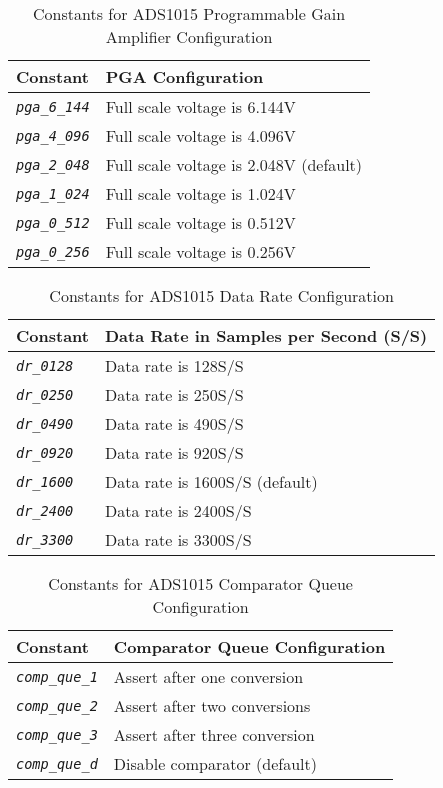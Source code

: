 \documentclass[10pt, openany]{book}
\newcommand{\constant}[1]{\emph{\texttt{#1}}}
\begin{document}
\begin{table}[!h]
\begin{center}
  \begin{tabular}{l|l}
    Constant & PGA Configuration \\
    \hline
    \constant{pga\_6\_144} & Full scale voltage is 6.144V \\
    \constant{pga\_4\_096} & Full scale voltage is 4.096V \\
    \constant{pga\_2\_048} & Full scale voltage is 2.048V (default) \\
    \constant{pga\_1\_024} & Full scale voltage is 1.024V \\
    \constant{pga\_0\_512} & Full scale voltage is 0.512V \\
    \constant{pga\_0\_256} & Full scale voltage is 0.256V \\
  \end{tabular}
  \caption{Constants for ADS1015 Programmable Gain Amplifier Configuration}
  \label{tbl:ADS1015PGA}
\end{center}
\end{table}

\begin{table}[!h]
\begin{center}
  \begin{tabular}{l|l}
    Constant & Data Rate in Samples per Second (S/S) \\
    \hline
    \constant{dr\_0128} & Data rate is 128S/S \\
    \constant{dr\_0250} & Data rate is 250S/S \\
    \constant{dr\_0490} & Data rate is 490S/S \\
    \constant{dr\_0920} & Data rate is 920S/S \\
    \constant{dr\_1600} & Data rate is 1600S/S (default) \\
    \constant{dr\_2400} & Data rate is 2400S/S \\
    \constant{dr\_3300} & Data rate is 3300S/S \\
  \end{tabular}
  \caption{Constants for ADS1015 Data Rate Configuration}
  \label{tbl:ADS1015DRC}
\end{center}
\end{table}

\begin{table}[!h]
\begin{center}
  \begin{tabular}{l|l}
    Constant & Comparator Queue Configuration \\
    \hline
    \constant{comp\_que\_1} & Assert after one conversion \\
    \constant{comp\_que\_2} & Assert after two conversions \\
    \constant{comp\_que\_3} & Assert after three conversion \\
    \constant{comp\_que\_d} & Disable comparator (default) \\
  \end{tabular}
  \caption{Constants for ADS1015 Comparator Queue Configuration}
  \label{tbl:ADS1015CompQ}
\end{center}
\end{table}
\end{document}
